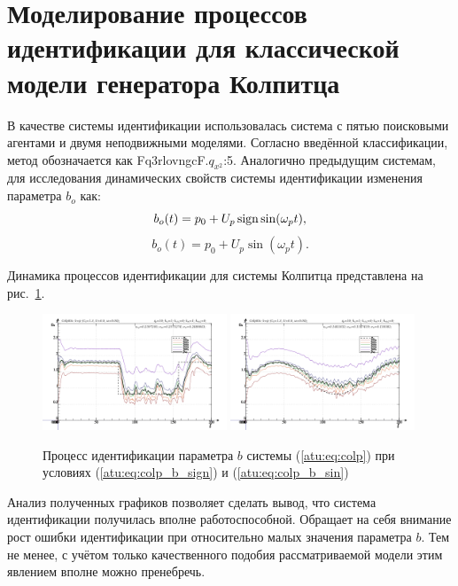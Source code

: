 
\section{Моделирование процессов идентификации для классической модели генератора Колпитца} %

В качестве системы идентификации использовалась система с пятью поисковыми агентами и
двумя неподвижными моделями.
Согласно введённой классификации, метод обозначается как  Fq3rlovngcF.$q_{x^2}$:5.
Аналогично предыдущим системам,
для исследования динамических свойств системы идентификации
изменения параметра $b_o$ как:
%
\begin{equation}
 b_o(t) = p_0 + U_p \operatorname*{sign} \sin( \omega_p t ),
  \label{atu:eq:colp_b_sign}
\end{equation}
%
\begin{equation}
 b_o(t) = p_0 + U_p \sin( \omega_p t ).
  \label{atu:eq:colp_b_sin}
\end{equation}

Динамика процессов идентификации для системы Колпитца представлена на рис.~\ref{atu:f:colp_id}.

\begin{figure}[htb!]
\centerline{
  \includegraphics[width=0.49\textwidth]{p/mod/colp_m5p-pl_n_sign.png}
  \includegraphics[width=0.49\textwidth]{p/mod/colp_m5p-pl_n_sin.png}
}
\caption{Процесс идентификации параметра $b$ системы (\ref{atu:eq:colp})
  при условиях (\ref{atu:eq:colp_b_sign}) и (\ref{atu:eq:colp_b_sin})
}
\label{atu:f:colp_id}
\end{figure}

Анализ полученных графиков позволяет сделать вывод,
что система идентификации получилась вполне работоспособной.
Обращает на себя внимание рост ошибки идентификации при относительно малых
значения параметра $b$. Тем не менее, с учётом только качественного подобия
рассматриваемой модели этим явлением вполне можно пренебречь.

